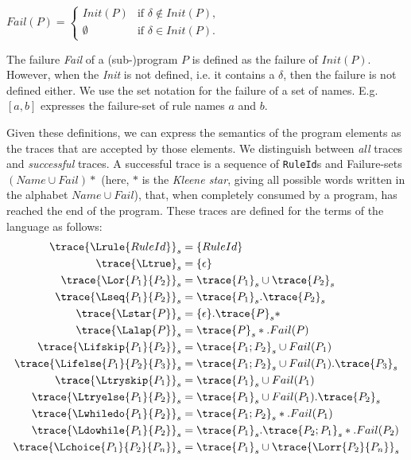 \begin{math}
Fail(P) = \begin{cases}
Init(P)& \text{if $\delta \not\in Init(P)$,}\\
\emptyset& \text{if $\delta \in Init(P)$.}
\end{cases}
\end{math}

The failure \emph{Fail} of a (sub-)program $P$ is defined as the failure of $Init(P)$. However, when the \emph{Init} is not defined, i.e. it contains a $\delta$, then the failure is not defined either. We use the set notation for the failure of a set of names. E.g. $[a,b]$ expresses the failure-set of rule names $a$ and $b$.

Given these definitions, we can express the semantics of the program elements as the traces that are accepted by those elements. We distinguish between \emph{all} traces and \emph{successful} traces. A successful trace is a sequence of {\tt RuleId}s and Failure-sets ${(Name \cup Fail)*}$ (here, $*$ is the \emph{Kleene star}, giving all possible words written in the alphabet $Name \cup Fail$), that, when completely consumed by a program, has reached the end of the program. These traces are defined for the terms of the language as follows:
%
\begin{align*}
\trace{\Lrule{RuleId}}_{s} &= \{ RuleId \}\\
\trace{\Ltrue}_{s} &= \{ \epsilon \}\\
\trace{\Lor{P_{1}}{P_{2}}}_{s} &= \trace{P_{1}}_{s} \cup \trace{P_2}_{s}\\
\trace{\Lseq{P_{1}}{P_{2}}}_{s} &= \trace{P_{1}}_{s} . \trace{P_2}_{s}\\
\trace{\Lstar{P}}_{s} &= \{\epsilon\} . \trace{P}_{s}*\\
\trace{\Lalap{P}}_{s} &= \trace{P}_{s}* . Fail(P)\\
\trace{\Lifskip{P_1}{P_{2}}}_{s} &= \trace{P_1;P_2}_{s} \cup Fail(P_1)\\
\trace{\Lifelse{P_1}{P_{2}}{P_{3}}}_{s} &=
				\trace{P_1;P_{2}}_{s} \cup Fail(P_1).\trace{P_3}_{s}\\
\trace{\Ltryskip{P_1}}_{s} &= \trace{P_{1}}_{s} \cup Fail(P_1)\\
\trace{\Ltryelse{P_1}{P_2}}_{s} &=
				\trace{P_{1}}_{s} \cup Fail(P_1) . \trace{P_2}_{s}\\
\trace{\Lwhiledo{P_1}{P_2}}_{s} &= \trace{P_1;P_2}_{s}* . Fail(P_1)\\
\trace{\Ldowhile{P_1}{P_2}}_s &= \trace{P_1}_s . \trace{P_2;P_1}_s* . Fail(P_2)\\
\trace{\Lchoice{P_{1}}{P_2}{P_n}}_{s} &= \trace{P_{1}}_{s} \cup \trace{\Lorr{P_2}{P_n}}_{s}\\
\end{align*}
